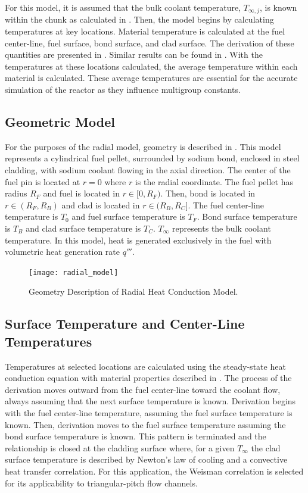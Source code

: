   For this model, it is assumed
  that the bulk coolant temperature, $T_{\infty,j}$, is known within the chunk 
  as calculated in . Then, the model begins by 
  calculating temperatures at key locations. Material temperature is calculated
  at the fuel center-line, fuel surface, bond surface, and clad surface. The
  derivation of these quantities are presented in . 
  Similar results can be found in \cite{FastSpectrumReactors}. With the
  temperatures at these locations calculated, the average temperature within
  each material is calculated. These average temperatures are essential for the
  accurate simulation of the reactor as they influence multigroup constants.

  \subsection{Geometric Model}
    For the purposes of the radial model, geometry is described in
    . This model represents a cylindrical fuel pellet,
    surrounded by sodium bond, enclosed in steel cladding, with sodium coolant
    flowing in the axial direction. The center of the fuel pin is located at
    $r=0$ where $r$ is the radial coordinate. The fuel pellet has radius $R_F$
    and fuel is located in $r \in [0,R_F)$. Then, bond is located in 
    $r \in (R_F,R_B)$ and clad is located in $r \in (R_B,R_C]$. The fuel 
    center-line temperature is $T_0$ and fuel surface temperature is $T_F$. Bond
    surface temperature is $T_B$ and clad surface temperature is 
    $T_C$. $T_{\infty}$ represents the bulk coolant temperature. In this model,
    heat is generated exclusively in the fuel with volumetric heat generation 
    rate $q'''$. 

    \begin{figure}
      \centering
      \texttt{[image: radial\_model]}
      \caption{Geometry Description of Radial Heat Conduction Model.}
      \label{fig:radial_model}
    \end{figure}

  \subsection{Surface Temperature and Center-Line Temperatures}
    \label{sec:surface_temps}
    Temperatures at selected locations are calculated using the steady-state
    heat conduction equation with material properties described in
    . The process of the derivation moves outward
    from the fuel center-line toward the coolant flow, always assuming that the
    next surface temperature is known. Derivation begins with the fuel 
    center-line temperature, assuming the fuel surface temperature is known. 
    Then, derivation moves to the fuel surface temperature assuming the bond 
    surface temperature is known. This pattern is terminated and the 
    relationship is closed at the cladding surface where, for a given 
    $T_{\infty}$ the clad surface temperature is described by Newton's law of 
    cooling and a convective heat transfer correlation. For this application, 
    the Weisman correlation is selected for its applicability to 
    triangular-pitch flow channels.  

